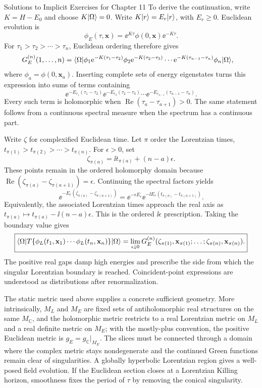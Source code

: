 \begin{bankssolutions}{Solutions to Implicit Exercises for Chapter 11}
To derive the continuation, write $K=H-E_0$ and choose
$K\lvert \Omega\rangle=0$.  Write $K\lvert r\rangle=E_r\lvert r\rangle$, with $E_r\geq0$.
Euclidean evolution is
\[
 \phi_E(\tau,\mathbf x)
 =\ee^{K\tau}\phi(0,\mathbf x)\ee^{-K\tau}.
\]
For $\tau_1>\tau_2>\cdots>\tau_n$, Euclidean ordering therefore gives
\begin{align*}
 G_E^{(n)}(1,\ldots,n)
 ={}&\langle \Omega\rvert\phi_1
 \mathrm{e}^{-K(\tau_1-\tau_2)}\phi_2
 \mathrm{e}^{-K(\tau_2-\tau_3)}\cdots
 \mathrm{e}^{-K(\tau_{n-1}-\tau_n)}\phi_n\lvert \Omega\rangle,
\end{align*}
where $\phi_a=\phi(0,\mathbf x_a)$.  Inserting complete sets of energy
eigenstates turns this expression into sums of terms containing
\[
 \ee^{-E_{r_1}(\tau_1-\tau_2)}
 \ee^{-E_{r_2}(\tau_2-\tau_3)}\cdots
 \ee^{-E_{r_{n-1}}(\tau_{n-1}-\tau_n)}.
\]
Every such term is holomorphic when
$\operatorname{Re}(\tau_a-\tau_{a+1})>0$.  The same statement follows from a
continuous spectral measure when the spectrum has a continuous part.

Write $\zeta$ for complexified Euclidean time.  Let $\pi$ order the Lorentzian
times,
$t_{\pi(1)}>t_{\pi(2)}>\cdots>t_{\pi(n)}$.  For $\epsilon>0$, set
\[
 \zeta_{\pi(a)}=\ii t_{\pi(a)}+(n-a)\epsilon.
\]
These points remain in the ordered holomorphy domain because
$\operatorname{Re}(\zeta_{\pi(a)}-\zeta_{\pi(a+1)})=\epsilon$.  Continuing the
spectral factors yields
\[
 \ee^{-E_r(\zeta_{\pi(a)}-\zeta_{\pi(a+1)})}
 =\ee^{-\epsilon E_r}
  \ee^{-\ii E_r(t_{\pi(a)}-t_{\pi(a+1)})}.
\]
Equivalently, the associated Lorentzian times approach the real axis as
$t_{\pi(a)}\mapsto t_{\pi(a)}-\ii(n-a)\epsilon$.  This is the ordered
$\ii\epsilon$ prescription.
Taking the boundary value gives
\[
 \boxed{
 \langle \Omega\rvert T\{\phi_L(t_1,\mathbf x_1)\cdots
 \phi_L(t_n,\mathbf x_n)\}\lvert \Omega\rangle
 =\lim_{\epsilon\downarrow0}
 G_E^{(n)}(\zeta_{\pi(1)},\mathbf x_{\pi(1)};\ldots;
 \zeta_{\pi(n)},\mathbf x_{\pi(n)}).}
\]
The positive real gaps damp high energies and prescribe the side from which
the singular Lorentzian boundary is reached.  Coincident-point expressions
are understood as distributions after renormalization.

The static metric used above supplies a concrete sufficient geometry.  More
intrinsically, $M_L$ and $M_E$ are fixed sets of antiholomorphic real
structures on the same $M_{\mathbb C}$, and the holomorphic metric restricts
to a real Lorentzian metric on $M_L$ and a real definite metric on $M_E$; with
the mostly-plus convention, the positive Euclidean metric is
$g_E=g_{\mathbb C}|_{M_E}$.  The slices must be connected through a domain
where the complex metric stays nondegenerate and the continued Green functions
remain clear of singularities.  A globally hyperbolic Lorentzian region gives
a well-posed field evolution.  If the Euclidean section closes at a Lorentzian
Killing horizon, smoothness fixes the period of $\tau$ by removing the conical
singularity.


\end{bankssolutions}
